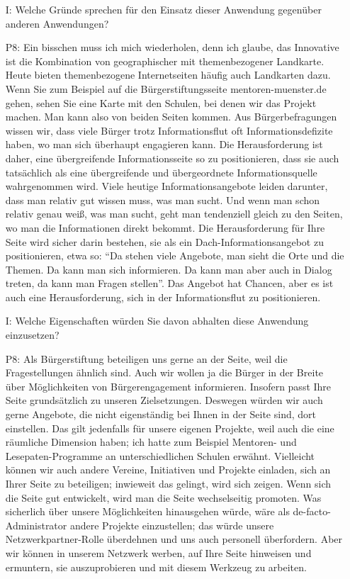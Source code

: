 \begin{itemize}
    \item[I:] Welche Gr{\"u}nde sprechen f{\"u}r den Einsatz dieser Anwendung gegen{\"u}ber anderen Anwendungen?
    \item[P8:] Ein bisschen muss ich mich wiederholen, denn ich glaube, das Innovative ist die Kombination von geographischer mit themenbezogener Landkarte. Heute bieten themenbezogene Internetseiten h{\"a}ufig auch Landkarten dazu. Wenn Sie zum Beispiel auf die B{\"u}rgerstiftungsseite mentoren-muenster.de gehen, sehen Sie eine Karte mit den Schulen, bei denen wir das Projekt machen. Man kann also von beiden Seiten kommen. Aus B{\"u}rgerbefragungen wissen wir, dass viele B{\"u}rger trotz Informationsflut oft Informationsdefizite haben, wo man sich {\"u}berhaupt engagieren kann. Die Herausforderung ist daher, eine {\"u}bergreifende Informationsseite so zu positionieren, dass sie auch tats{\"a}chlich als eine {\"u}bergreifende und {\"u}bergeordnete Informationsquelle wahrgenommen wird. Viele heutige Informationsangebote leiden darunter, dass man relativ gut wissen muss, was man sucht. Und wenn man schon relativ genau wei{\ss}, was man sucht, geht man tendenziell gleich zu den Seiten, wo man die Informationen direkt bekommt. Die Herausforderung f{\"u}r Ihre Seite wird sicher darin bestehen, sie als ein Dach-Informationsangebot zu positionieren, etwa so: "`Da stehen viele Angebote, man sieht die Orte und die Themen. Da kann man sich informieren. Da kann man aber auch in Dialog treten, da kann man Fragen stellen"'. Das Angebot hat Chancen, aber es ist auch eine Herausforderung, sich in der Informationsflut zu positionieren.
    \item[I:] Welche Eigenschaften w{\"u}rden Sie davon abhalten diese Anwendung einzusetzen?
    \item[P8:] Als B{\"u}rgerstiftung beteiligen uns gerne an der Seite, weil die Fragestellungen {\"a}hnlich sind. Auch wir wollen ja die B{\"u}rger in der Breite {\"u}ber M{\"o}glichkeiten von B{\"u}rgerengagement informieren. Insofern passt Ihre Seite grunds{\"a}tzlich zu unseren Zielsetzungen. Deswegen w{\"u}rden wir auch gerne Angebote, die nicht eigenst{\"a}ndig bei Ihnen in der Seite sind, dort einstellen. Das gilt jedenfalls f{\"u}r unsere eigenen Projekte, weil auch die eine r{\"a}umliche Dimension haben; ich hatte zum Beispiel Mentoren- und Lesepaten-Programme an unterschiedlichen Schulen erw{\"a}hnt. Vielleicht k{\"o}nnen wir auch andere Vereine, Initiativen und Projekte einladen, sich an Ihrer Seite zu beteiligen; inwieweit das gelingt, wird sich zeigen. Wenn sich die Seite gut entwickelt, wird man die Seite wechselseitig promoten. Was sicherlich {\"u}ber unsere M{\"o}glichkeiten hinausgehen w{\"u}rde, w{\"a}re als de-facto-Administrator andere Projekte einzustellen; das w{\"u}rde unsere Netzwerkpartner-Rolle {\"u}berdehnen und uns auch personell {\"u}berfordern. Aber wir k{\"o}nnen in unserem Netzwerk werben, auf Ihre Seite hinweisen und ermuntern, sie auszuprobieren und mit diesem Werkzeug zu arbeiten.

\end{itemize}
